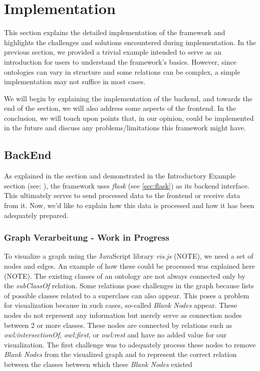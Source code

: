 \section{Implementation}
\label{sec:Implementation}

This section explains the detailed implementation of the framework and highlights the challenges and solutions encountered during implementation. In the previous section, we provided a trivial example intended to serve as an introduction for users to understand the framework's basics. However, since ontologies can vary in structure and some relations can be complex, a simple implementation may not suffice in most cases.

We will begin by explaining the implementation of the backend, and towards the end of the section, we will also address some aspects of the frontend. In the conclusion, we will touch upon points that, in our opinion, could be implemented in the future and discuss any problems/limitations this framework might have.
\subsection{BackEnd}

As explained in the  section and demonstrated in the Introductory Example section (see: ), the framework uses \textit{flask} (see \ref{sec:flask}) as its backend interface. 
This ultimately serves to send processed data to the frontend or receive data from it. Now, we'd like to explain how this data is processed and how it has been adequately prepared.
\subsubsection{Graph Verarbeitung - Work in Progress}

To visualize a graph using the JavaScript library \textit{vis.js} (NOTE), we need a set of nodes and edges. An example of how these could be processed was explained here (NOTE). The existing classes of an ontology are not always connected only by the \textit{subClassOf} relation. Some relations pose challenges in the graph because lists of possible classes related to a superclass can also appear. This poses a problem for visualization because in such cases, so-called \textit{Blank Nodes} appear. These nodes do not represent any information but merely serve as connection nodes between 2 or more classes. These nodes are connected by relations such as \textit{owl:intersectionOf}, \textit{owl:first}, or \textit{owl:rest} and have no added value for our visualization. The first challenge was to adequately process these nodes to remove \textit{Blank Nodes} from the visualized graph and to represent the correct relation between the classes between which these \textit{Blank Nodes} existed

